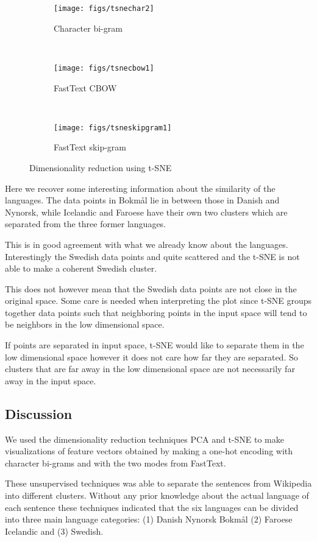 \documentclass[11pt,a4paper]{article}
\begin{document}
\begin{figure}
    \centering
    \begin{subfigure}[b]{0.47\textwidth}
        \texttt{[image: figs/tsnechar2]}
        \caption{Character bi-gram}
    \end{subfigure}
    ~
    \begin{subfigure}[b]{0.47\textwidth}
        \texttt{[image: figs/tsnecbow1]}
        \caption{FastText CBOW}
    \end{subfigure}
    ~
    \begin{subfigure}[b]{0.47\textwidth}
        \texttt{[image: figs/tsneskipgram1]}
        \caption{FastText skip-gram}
    \end{subfigure}
    \caption{Dimensionality reduction using t-SNE}
    \label{tsne}
\end{figure}


Here we recover some interesting information about the similarity of the languages. The data points in Bokmål lie in between those in Danish and Nynorsk, while Icelandic and Faroese have their own two clusters which are separated from the three former languages. 

This is in good agreement with what we already know about the languages. Interestingly the Swedish data points and quite scattered and the t-SNE is not able to make a coherent Swedish cluster.

This does not however mean that the Swedish data points are not close in the original space. Some care is needed when interpreting the plot since t-SNE groups together data points such that neighboring points in the input space will tend to be neighbors in the low dimensional space.

If points are separated in input space, t-SNE would like to separate them in the low dimensional space however it does not care how far they are separated. So clusters that are far away in the low dimensional space are not necessarily far away in the input space.

\subsection{Discussion}
We used the dimensionality reduction techniques PCA and t-SNE to make visualizations of feature vectors obtained by making a one-hot encoding with character bi-grams and with the two modes from FastText.

These unsupervised techniques was able to separate the sentences from Wikipedia into different clusters.
Without any prior knowledge about the actual language of each sentence these techniques indicated that the six languages can be divided into three main language categories: (1) Danish Nynorsk Bokmål (2) Faroese Icelandic and (3) Swedish.
\end{document}
